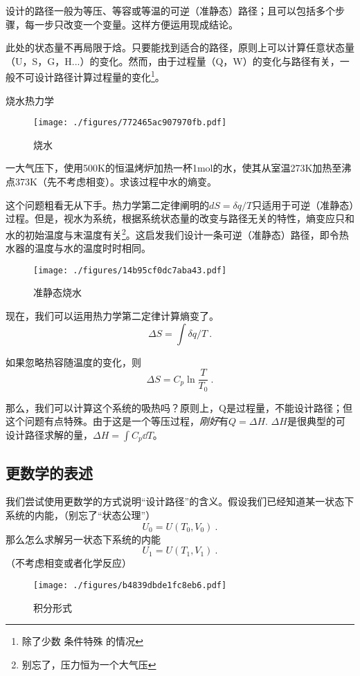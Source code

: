 设计的路径一般为等压、等容或等温的可逆（准静态）路径；且可以包括多个步骤，每一步只改变一个变量。这样方便运用现成结论。

此处的状态量不再局限于焓。只要能找到适合的路径，原则上可以计算任意状态量（U，S，G，H...）的变化。然而，由于过程量（Q，W）的变化与路径有关，一般不可设计路径计算过程量的变化\footnote{除了少数 条件特殊 的情况}。

\begin{example}{烧水热力学}
\begin{figure}[ht]
\centering
\texttt{[image: ./figures/772465ac907970fb.pdf]}
\caption{烧水} \label{fig_Hess_3}
\end{figure}
一大气压下，使用500K的恒温烤炉加热一杯1mol的水，使其从室温273K加热至沸点373K（先不考虑相变）。求该过程中水的熵变。

这个问题粗看无从下手。热力学第二定律阐明的$dS=\delta q/T$只适用于可逆（准静态）过程。但是，视水为系统，根据系统状态量的改变与路径无关的特性，熵变应只和水的初始温度与末温度有关\footnote{别忘了，压力恒为一个大气压}。这启发我们设计一条可逆（准静态）路径，即令热水器的温度与水的温度时时相同。

\begin{figure}[ht]
\centering
\texttt{[image: ./figures/14b95cf0dc7aba43.pdf]}
\caption{准静态烧水} \label{fig_Hess_4}
\end{figure}
现在，我们可以运用热力学第二定律计算熵变了。
$$\Delta S=\int \delta q/T~.$$

如果忽略热容随温度的变化，则 
$$\Delta S=C_p \ln \frac{T}{T_0}~.$$

那么，我们可以计算这个系统的吸热吗？原则上，Q是过程量，不能设计路径；但这个问题有点特殊。由于这是一个等压过程，\textsl{刚好}有$Q=\Delta H$. $\Delta H$是很典型的可设计路径求解的量，$\Delta H = \int C_p \dd T$。
\end{example}

\subsection{更数学的表述}
我们尝试使用更数学的方式说明“设计路径”的含义。假设我们已经知道某一状态下系统的内能，（别忘了“状态公理”）
$$U_0=U(T_0,V_0)~.$$
那么怎么求解另一状态下系统的内能
$$U_1=U(T_1,V_1)~.$$
（不考虑相变或者化学反应）

\begin{figure}[ht]
\centering
\texttt{[image: ./figures/b4839dbde1fc8eb6.pdf]}
\caption{积分形式} \label{fig_Hess_5}
\end{figure}

